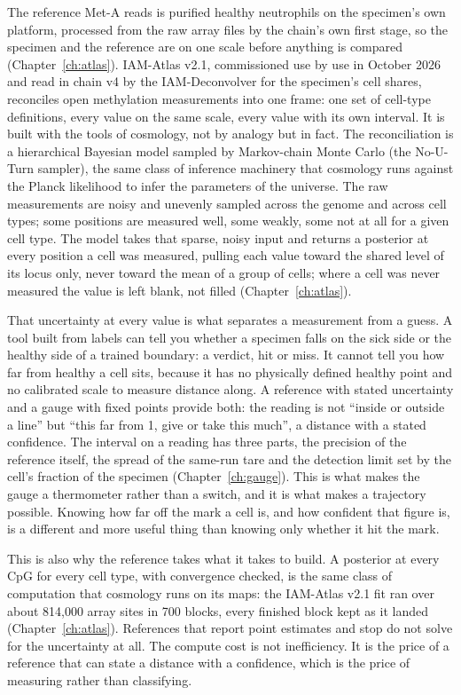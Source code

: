 The reference Met-A reads is purified healthy neutrophils on the specimen's own platform, processed from the raw array files by the
chain's own first stage, so the specimen and the reference are on one scale before anything is compared (Chapter~\ref{ch:atlas}).
\calibrated{} IAM-Atlas v2.1, commissioned use by use in October 2026 and read in chain v4 by the IAM-Deconvolver for the specimen's cell shares, reconciles open methylation measurements into one frame: one set of
cell-type definitions, every value on the same scale, every value with its own interval. It is built with the tools of cosmology, not by
analogy but in fact. The reconciliation is a hierarchical Bayesian model sampled by Markov-chain Monte Carlo (the No-U-Turn sampler), the
same class of inference machinery that cosmology runs against the Planck likelihood to infer the parameters of the universe. The raw
measurements are noisy and unevenly sampled across the genome and across cell types; some positions are measured well, some weakly, some
not at all for a given cell type. The model takes that sparse, noisy input and returns a posterior at every position a cell was measured,
pulling each value toward the shared level of its locus only, never toward the mean of a group of cells; where a cell was never measured
the value is left blank, not filled (Chapter~\ref{ch:atlas}). \calibrated

That uncertainty at every value is what separates a measurement from a guess. A tool built from labels can tell you whether a specimen
falls on the sick side or the healthy side of a trained boundary: a verdict, hit or miss. It cannot tell you how far from healthy a cell
sits, because it has no physically defined healthy point and no calibrated scale to measure distance along. A reference with stated
uncertainty and a gauge with fixed points provide both: the reading is not ``inside or outside a line'' but ``this far from 1, give or take
this much'', a distance with a stated confidence. The interval on a reading has three parts, the precision of the reference itself, the
spread of the same-run tare and the detection limit set by the cell's fraction of the specimen (Chapter~\ref{ch:gauge}). This is what makes
the gauge a thermometer rather than a switch, and it is what makes a trajectory possible. Knowing how far off the mark a cell is, and how
confident that figure is, is a different and more useful thing than knowing only whether it hit the mark. \interp

This is also why the reference takes what it takes to build. A posterior at every CpG for every cell type, with convergence checked, is
the same class of computation that cosmology runs on its maps: the IAM-Atlas v2.1 fit ran over about 814,000 array sites in 700 blocks, every finished
block kept as it landed (Chapter~\ref{ch:atlas}). \observed{} References that report point estimates and stop do not solve for the
uncertainty at all. The compute cost is not inefficiency. It is the price of a reference that can state a distance with a confidence,
which is the price of measuring rather than classifying. \interp

